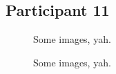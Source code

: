\lipsum[1]


\clearpage

\subsection{Participant 11}

\begin{figure}[h]
	\caption{Some images, yah.}
\end{figure}

\lipsum[1]

\clearpage

\begin{figure}[h]
	\caption{Some images, yah.}
\end{figure}

